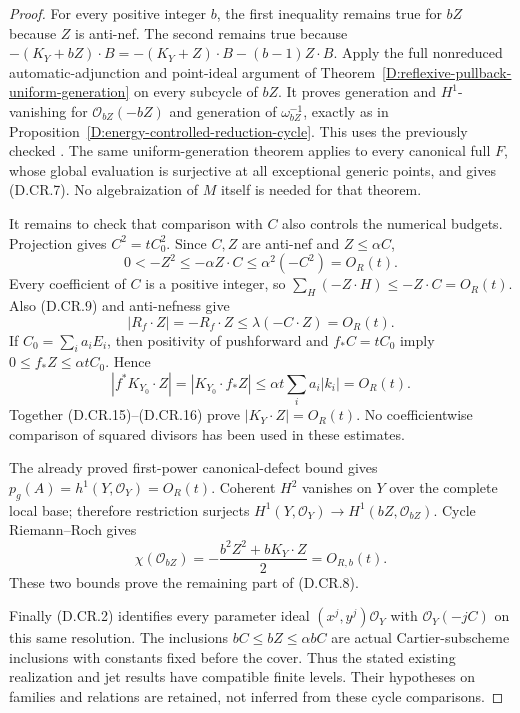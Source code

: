 \begin{proof}
For every positive integer $b$, the first inequality remains
true for $bZ$ because $Z$ is anti-nef. The second remains
true because
$-(K_Y+bZ)\cdot B=-(K_Y+Z)\cdot B-(b-1)Z\cdot B$.
Apply the full nonreduced automatic-adjunction and point-ideal
argument of Theorem~\ref{D:reflexive-pullback-uniform-generation}
on every subcycle of $bZ$. It proves generation and
$H^1$-vanishing for $\mathcal O_{bZ}(-bZ)$ and generation
of $\omega_{bZ}^{-1}$, exactly as in
Proposition~\ref{D:energy-controlled-reduction-cycle}.
This uses the previously checked
\citet[Lemma~2.4 and Theorem~1.1, complete written proof,
pp.~192--193]{C_CFHR1999}.
The same uniform-generation theorem applies to every
canonical full $F$, whose global evaluation is surjective
at all exceptional generic points, and gives (D.CR.7).
No algebraization of $M$ itself is needed for that theorem.

It remains to check that comparison with $C$ also controls
the numerical budgets. Projection gives
$C^2=tC_0^2$. Since $C,Z$ are anti-nef and $Z\le\alpha C$,
\[
       0<-Z^2\le-\alpha Z\cdot C
                         \le\alpha^2(-C^2)=O_R(t).
                                                               \tag{D.CR.14}
\]
Every coefficient of $C$ is a positive integer, so
$\sum_H(-Z\cdot H)\le-Z\cdot C=O_R(t)$.
Also (D.CR.9) and anti-nefness give
\[
                |R_f\cdot Z|
                  =-R_f\cdot Z\le\lambda(-C\cdot Z)
                  =O_R(t).                              \tag{D.CR.15}
\]
If $C_0=\sum_i a_iE_i$, then positivity of pushforward and
$f_*C=tC_0$ imply $0\le f_*Z\le\alpha tC_0$. Hence
\[
 |f^*K_{Y_0}\cdot Z|
    =|K_{Y_0}\cdot f_*Z|
    \le\alpha t\sum_i a_i|k_i|=O_R(t).
                                                               \tag{D.CR.16}
\]
Together (D.CR.15)--(D.CR.16) prove $|K_Y\cdot Z|=O_R(t)$.
No coefficientwise comparison of squared divisors has been
used in these estimates.

The already proved first-power canonical-defect bound gives
$p_g(A)=h^1(Y,\mathcal O_Y)=O_R(t)$.
Coherent $H^2$ vanishes on $Y$ over the complete local base;
therefore restriction surjects
$H^1(Y,\mathcal O_Y)\to H^1(bZ,\mathcal O_{bZ})$.
Cycle Riemann--Roch gives
\[
       \chi(\mathcal O_{bZ})
           =-\frac{b^2Z^2+bK_Y\cdot Z}{2}=O_{R,b}(t).
                                                               \tag{D.CR.17}
\]
These two bounds prove the remaining part of (D.CR.8).

Finally (D.CR.2) identifies every parameter ideal
$(x^j,y^j)\mathcal O_Y$ with $\mathcal O_Y(-jC)$ on this
same resolution. The inclusions $bC\le bZ\le\alpha bC$
are actual Cartier-subscheme inclusions with constants fixed
before the cover. Thus the stated existing realization and
jet results have compatible finite levels. Their hypotheses
on families and relations are retained, not inferred from
these cycle comparisons.
\end{proof}
